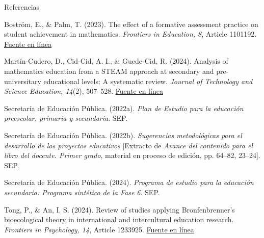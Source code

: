 \documentclass[
	spanish,
	aspectratio=1610,
	xcolor={dvipsnames,table}
]{beamer}
\begin{document}
\begin{frame}{Referencias}
\fontsize{9}{11}\selectfont\raggedright 
{\setlength{\parskip}{6pt}
\par\hangindent=1.27cm  Boström, E., \& Palm, T. (2023). The effect of a formative assessment practice on student achievement in mathematics. \textit{Frontiers in Education, 8}, Article 1101192. \href{https://doi.org/10.3389/feduc.2023.1101192}{Fuente en línea}
\par\hangindent=1.27cm  Martín-Cudero, D., Cid-Cid, A. I., \& Guede-Cid, R. (2024). Analysis of mathematics education from a STEAM approach at secondary and pre-universitary educational levels: A systematic review. \textit{Journal of Technology and Science Education, 14}(2), 507--528. \href{https://doi.org/10.3926/jotse.2349}{Fuente en línea}
\par\hangindent=1.27cm  Secretaría de Educación Pública. (2022a). \textit{Plan de Estudio para la educación preescolar, primaria y secundaria}. SEP.
\par\hangindent=1.27cm  Secretaría de Educación Pública. (2022b). \textit{Sugerencias metodológicas para el desarrollo de los proyectos educativos} [Extracto de \textit{Avance del contenido para el libro del docente. Primer grado}, material en proceso de edición, pp. 64--82, 23--24]. SEP.
\par\hangindent=1.27cm  Secretaría de Educación Pública. (2024). \textit{Programa de estudio para la educación secundaria: Programa sintético de la Fase 6}. SEP.
\par\hangindent=1.27cm  Tong, P., \& An, I. S. (2024). Review of studies applying Bronfenbrenner’s bioecological theory in international and intercultural education research. \textit{Frontiers in Psychology, 14}, Article 1233925. \href{https://doi.org/10.3389/fpsyg.2023.1233925}{Fuente en línea}
}


\end{frame}
\end{document}

